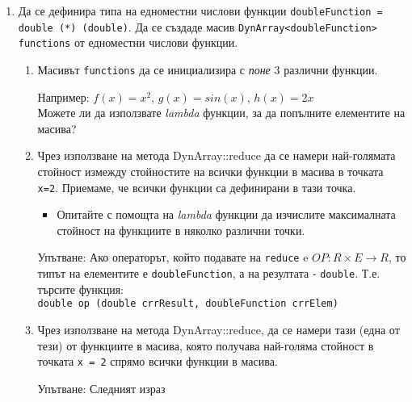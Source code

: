 \documentclass[12pt,a4paper]{article}
\begin{document}
\begin{enumerate}
\begin{enumerate}
		\end{enumerate}
		
	\item Да се дефинира типа на едноместни числови функции \texttt{doubleFunction = double (*) (double)}. Да се създаде масив \texttt{DynArray<doubleFunction> functions} от едноместни числови функции. 

	\begin{enumerate}
		\item Масивът \texttt{functions} да се инициализира с \textit{поне} 3 различни функции.
		\begin{mdframed}[hidealllines=true,backgroundcolor=gray!20]
		Например: $f(x)=x^2$, $g(x)=sin(x)$, $h(x) = 2x$\\

		Можете ли да използвате \textit{lambda} функции, за да попълните елементите на масива?
		\end{mdframed}

		\item Чрез използване на метода DynArray::reduce да се намери най-голямата стойност измежду стойностите на всички функции в масива в точката \texttt{x=2}. Приемаме, че всички функции са дефинирани в тази точка.
			\begin{itemize}
				\item Опитайте с помощта на \textit{lambda} функции да изчислите максималната стойност на функциите в няколко различни точки.
			\end{itemize}		
		\begin{mdframed}[hidealllines=true,backgroundcolor=gray!20]
				Упътване: Ако операторът, който подавате на \texttt{reduce}  e $OP: R \times E \rightarrow R$, то типът на елементите е \texttt{doubleFunction}, а на резултата - \texttt{double}. Т.е. търсите функция:\\

				\texttt{double op (double crrResult, doubleFunction crrElem)}
		\end{mdframed}

		\item Чрез използване на метода DynArray::reduce, да се намери тази (една от тези) от функциите в масива, която получава най-голяма стойност в точката \texttt{x = 2} спрямо всички функции в масива.

		\begin{mdframed}[hidealllines=true,backgroundcolor=gray!20]
				Упътване: Следният израз\\


\end{mdframed}
\end{enumerate}
\end{enumerate}
\end{document}
